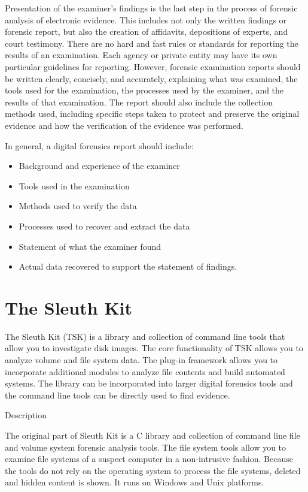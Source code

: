 Presentation of the examiner's findings is the last step in the process of forensic
analysis of electronic evidence. This includes not only the written findings or forensic
report, but also the creation of affidavits, depositions of experts, and court testimony.
There are no hard and fast rules or standards for reporting the results of an
examination. Each agency or private entity may have its own particular guidelines
for reporting. However, forensic examination reports should be written clearly, concisely,
and accurately, explaining what was examined, the tools used for the examination,
the processes used by the examiner, and the results of that examination.
The report should also include the collection methods used, including specific steps
taken to protect and preserve the original evidence and how the verification of the
evidence was performed.

In general, a digital forensics report should include:

\begin{itemize}
\item Background and experience of the examiner
\item Tools used in the examination
\item Methods used to verify the data
\item Processes used to recover and extract the data
\item Statement of what the examiner found
\item Actual data recovered to support the statement of findings.
\end{itemize}

\section{The Sleuth Kit}

The Sleuth Kit (TSK) is a library and collection of command line tools that allow
you to investigate disk images. The core functionality of TSK allows you to analyze
volume and file system data. The plug-in framework allows you to incorporate
additional modules to analyze file contents and build automated systems. The
library can be incorporated into larger digital forensics tools and the command
line tools can be directly used to find evidence.

Description

The original part of Sleuth Kit is a C library and collection of command line
file and volume system forensic analysis tools. The file system tools allow you
to examine file systems of a suspect computer in a non-intrusive fashion. Because
the tools do not rely on the operating system to process the file systems, deleted
and hidden content is shown. It runs on Windows and Unix platforms.

